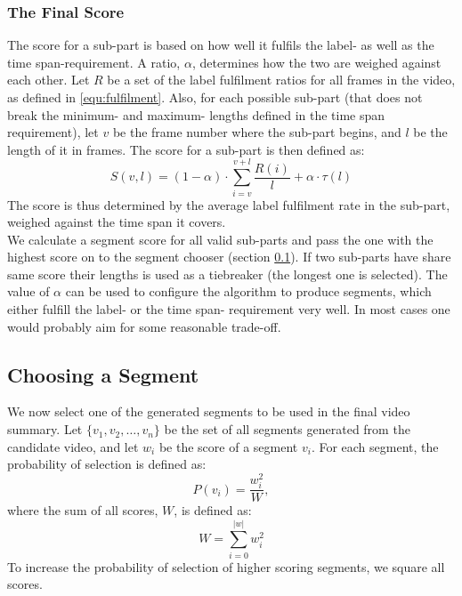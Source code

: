 \subsubsection{The Final Score}
%
The score for a sub-part is based on how well it fulfils the label- as well as the time span-requirement. A ratio, $\alpha$, determines how the two are weighed against each other. Let $R$ be a set of the label fulfilment ratios for all frames in the video, as defined in \ref{equ:fulfilment}. Also, for each possible sub-part (that does not break the minimum- and maximum- lengths defined in the time span requirement), let $v$ be the frame number where the sub-part begins, and $l$ be the length of it in frames. The score for a sub-part is then defined as:\\
%
\begin{equation}
S(v,l) =(1-\alpha) \cdot \sum_{i=v}^{v+l} \frac{R(i)}{l} + \alpha \cdot \tau(l)
\end{equation}\label{equ:segment_score}
%
The score is thus determined by the average label fulfilment rate in the sub-part, weighed against the time span it covers.\\
We calculate a segment score for all valid sub-parts and pass the one with the highest score on to the segment chooser (section \ref{sec:choosing_segment}). If two sub-parts have share same score their lengths is used as a tiebreaker (the longest one is selected). The value of $\alpha$ can be used to configure the algorithm to produce segments, which either fulfill the label- or the time span- requirement very well. In most cases one would probably aim for some reasonable trade-off.
%
%
\subsection{Choosing a Segment}\label{sec:choosing_segment}
%
We now select one of the generated segments to be used in the final video summary. Let $\{v_1,v_2,\dots,v_n\}$ be the set of all segments generated from the candidate video, and let $w_i$ be the score of a segment $v_i$. For each segment, the probability of selection is defined as:
%
\[
P(v_i) = \frac{w_i^2}{W},
\]
%
where the sum of all scores, $W$, is defined as:
%
\[
W = \sum_{i=0}^{|w|} w_i^2
\]
%
To increase the probability of selection of higher scoring segments, we square all scores.
%